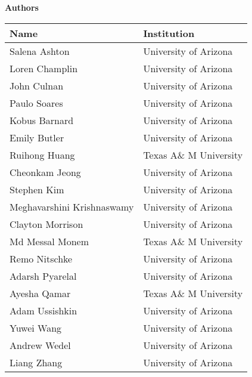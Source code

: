 \documentclass[oneside,9pt]{memoir}
\begin{document}
\begin{center}

    \bigskip

    \textbf{Authors}

    \bigskip

    \begin{tabular}{ll}
        \toprule
        Name                       & Institution \\\midrule
        Salena Ashton              & University of Arizona\\
        Loren Champlin             & University of Arizona\\
        John Culnan                & University of Arizona\\
        Paulo Soares               & University of Arizona\\
        Kobus Barnard              & University of Arizona\\
        Emily Butler               & University of Arizona\\
        Ruihong Huang              & Texas A\& M University \\
        Cheonkam Jeong             & University of Arizona\\
        Stephen Kim                & University of Arizona\\
        Meghavarshini Krishnaswamy & University of Arizona\\
        Clayton Morrison           & University of Arizona\\
        Md Messal Monem            & Texas A\& M University \\
        Remo Nitschke              & University of Arizona\\
        Adarsh Pyarelal            & University of Arizona\\
        Ayesha Qamar               & Texas A\& M University \\
        Adam Ussishkin             & University of Arizona\\
        Yuwei Wang                 & University of Arizona\\
        Andrew Wedel               & University of Arizona\\
        Liang Zhang                & University of Arizona\\
        \bottomrule
    \end{tabular}
\end{center}

\newpage
\tableofcontents* 











\printbibliography
\end{document}
